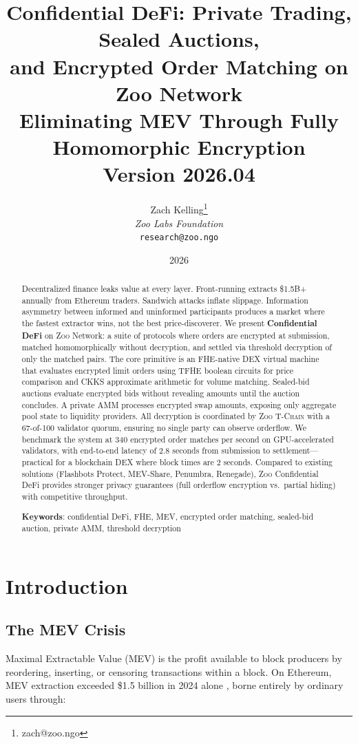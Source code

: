\documentclass[11pt,letterpaper]{article}
\title{\textbf{Confidential DeFi: Private Trading, Sealed Auctions,\\and Encrypted Order Matching on Zoo Network}\\
\large Eliminating MEV Through Fully Homomorphic Encryption\\
\vspace{5pt}
\normalsize Version 2026.04}
\author{
Zach Kelling\thanks{zach@zoo.ngo}\\
\textit{Zoo Labs Foundation}\\
\texttt{research@zoo.ngo}
}
\date{2026}
\theoremstyle{definition}
\theoremstyle{remark}
\newcommand{\Zoo}{\textsc{Zoo}}
\newcommand{\TChain}{\textsc{T-Chain}}
\newcommand{\TFHE}{\textsc{TFHE}}
\newcommand{\CKKS}{\textsc{CKKS}}
\newcommand{\FHE}{\textsc{FHE}}
\newcommand{\MEV}{\textsc{MEV}}
\newcommand{\AMM}{\textsc{AMM}}
\newcommand{\DEX}{\textsc{DEX}}
\begin{document}
\zoocoverpage

\begin{abstract}
Decentralized finance leaks value at every layer. Front-running extracts \$1.5B+ annually from Ethereum traders. Sandwich attacks inflate slippage. Information asymmetry between informed and uninformed participants produces a market where the fastest extractor wins, not the best price-discoverer. We present \textbf{Confidential DeFi} on \Zoo{} Network: a suite of protocols where orders are encrypted at submission, matched homomorphically without decryption, and settled via threshold decryption of only the matched pairs. The core primitive is an \FHE{}-native \DEX{} virtual machine that evaluates encrypted limit orders using \TFHE{} boolean circuits for price comparison and \CKKS{} approximate arithmetic for volume matching. Sealed-bid auctions evaluate encrypted bids without revealing amounts until the auction concludes. A private \AMM{} processes encrypted swap amounts, exposing only aggregate pool state to liquidity providers. All decryption is coordinated by \Zoo{} \TChain{} with a 67-of-100 validator quorum, ensuring no single party can observe orderflow. We benchmark the system at 340 encrypted order matches per second on GPU-accelerated validators, with end-to-end latency of 2.8 seconds from submission to settlement---practical for a blockchain \DEX{} where block times are 2 seconds. Compared to existing solutions (Flashbots Protect, MEV-Share, Penumbra, Renegade), \Zoo{} Confidential DeFi provides stronger privacy guarantees (full orderflow encryption vs.\ partial hiding) with competitive throughput.

\textbf{Keywords}: confidential DeFi, FHE, MEV, encrypted order matching, sealed-bid auction, private AMM, threshold decryption
\end{abstract}

\tableofcontents
\newpage

\section{Introduction}
\label{sec:intro}

\subsection{The MEV Crisis}

Maximal Extractable Value (\MEV{}) is the profit available to block producers by reordering, inserting, or censoring transactions within a block. On Ethereum, \MEV{} extraction exceeded \$1.5 billion in 2024 alone \cite{flashbots2024mev}, borne entirely by ordinary users through:
\end{document}
